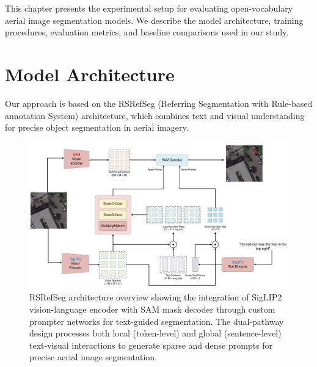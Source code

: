\cleardoublepage
\label{chap:evaluation}

This chapter presents the experimental setup for evaluating open-vocabulary aerial image segmentation models. We describe the model architecture, training procedures, evaluation metrics, and baseline comparisons used in our study.

\section{Model Architecture}

Our approach is based on the RSRefSeg (Referring Segmentation with Rule-based annotation System) architecture, which combines text and visual understanding for precise object segmentation in aerial imagery.

\begin{figure}[H]
\centering
\includegraphics[width=\textwidth]{./Images/clipsam.png}
\caption{RSRefSeg architecture overview showing the integration of SigLIP2 vision-language encoder with SAM mask decoder through custom prompter networks for text-guided segmentation. The dual-pathway design processes both local (token-level) and global (sentence-level) text-visual interactions to generate sparse and dense prompts for precise aerial image segmentation.}
\label{fig:rsrefseg_architecture}
\end{figure}


